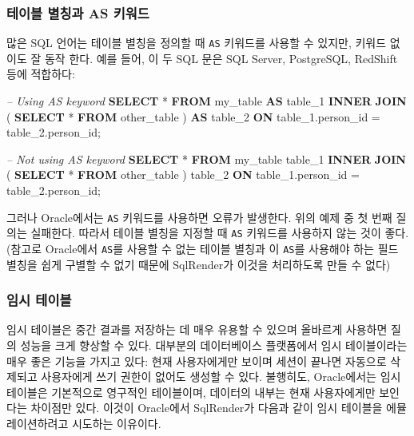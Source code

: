 \documentclass[10.5pt]{book}
\newenvironment{Shaded}{\begin{snugshade}}{\end{snugshade}}
\newcommand{\KeywordTok}[1]{\textcolor[rgb]{0.13,0.29,0.53}{\textbf{#1}}}
\newcommand{\DecValTok}[1]{\textcolor[rgb]{0.00,0.00,0.81}{#1}}
\newcommand{\CommentTok}[1]{\textcolor[rgb]{0.56,0.35,0.01}{\textit{#1}}}
\newcommand{\NormalTok}[1]{#1}
\theoremstyle{definition}
\theoremstyle{definition}
\theoremstyle{definition}
\theoremstyle{remark}
\begin{document}
\subsubsection*{테이블 별칭과 AS 키워드}\label{--as-}

많은 SQL 언어는 테이블 별칭을 정의할 때 \texttt{AS} 키워드를 사용할 수
있지만, 키워드 없이도 잘 동작 한다. 예를 들어, 이 두 SQL 문은 SQL
Server, PostgreSQL, RedShift 등에 적합하다:

\begin{Shaded}
\begin{Highlighting}[]
\CommentTok{-- Using AS keyword}
\KeywordTok{SELECT}\NormalTok{ * }
\KeywordTok{FROM}\NormalTok{ my_table }\KeywordTok{AS}\NormalTok{ table_}\DecValTok{1}
\KeywordTok{INNER} \KeywordTok{JOIN}\NormalTok{ (}
  \KeywordTok{SELECT}\NormalTok{ * }\KeywordTok{FROM}\NormalTok{ other_table}
\NormalTok{) }\KeywordTok{AS}\NormalTok{ table_}\DecValTok{2}
\KeywordTok{ON}\NormalTok{ table_1.person_id = table_2.person_id;}

\CommentTok{-- Not using AS keyword}
\KeywordTok{SELECT}\NormalTok{ * }
\KeywordTok{FROM}\NormalTok{ my_table table_}\DecValTok{1}
\KeywordTok{INNER} \KeywordTok{JOIN}\NormalTok{ (}
  \KeywordTok{SELECT}\NormalTok{ * }\KeywordTok{FROM}\NormalTok{ other_table}
\NormalTok{) table_}\DecValTok{2}
\KeywordTok{ON}\NormalTok{ table_1.person_id = table_2.person_id;}
\end{Highlighting}
\end{Shaded}

그러나 Oracle에서는 \texttt{AS} 키워드를 사용하면 오류가 발생한다. 위의
예제 중 첫 번째 질의는 실패한다. 따라서 테이블 별칭을 지정할 때
\texttt{AS} 키워드를 사용하지 않는 것이 좋다. (참고로 Oracle에서
\texttt{AS}를 사용할 수 없는 테이블 별칭과 이 \texttt{AS}를 사용해야
하는 필드 별칭을 쉽게 구별할 수 없기 때문에 SqlRender가 이것을
처리하도록 만들 수 없다)

\subsubsection*{임시 테이블}\label{-}

임시 테이블은 중간 결과를 저장하는 데 매우 유용할 수 있으며 올바르게
사용하면 질의 성능을 크게 향상할 수 있다. 대부분의 데이터베이스
플랫폼에서 임시 테이블이라는 매우 좋은 기능을 가지고 있다: 현재
사용자에게만 보이며 세션이 끝나면 자동으로 삭제되고 사용자에게 쓰기
권한이 없어도 생성할 수 있다. 불행히도, Oracle에서는 임시테이블은
기본적으로 영구적인 테이블이며, 데이터의 내부는 현재 사용자에게만
보인다는 차이점만 있다. 이것이 Oracle에서 SqlRender가 다음과 같이 임시
테이블을 에뮬레이션하려고 시도하는 이유이다.
\end{document}
